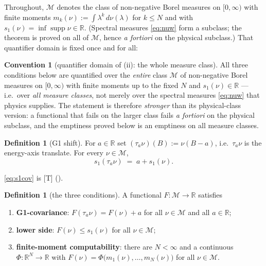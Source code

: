 \documentclass[11pt]{article}
\theoremstyle{definition}
\newtheorem{definition}[theorem]{Definition}
\newtheorem{convention}[theorem]{Convention}
\theoremstyle{remark}
\newcommand{\code}[1]{\texttt{\footnotesize\detokenize{#1}}}
\newcommand{\grT}{\textsf{[T]}}
\begin{document}
Throughout, $\mathcal M$ denotes the class of non-negative Borel measures on
$[0,\infty)$ with finite moments $m_k(\nu):=\int\lambda^k\,d\nu(\lambda)$ for
$k\le N$ and with $s_1(\nu)=\inf\operatorname{supp}\nu\in\mathbb R$. (Spectral
measures \eqref{eq:nuw} form a subclass; the theorem is proved on all of
$\mathcal M$, hence \emph{a fortiori} on the physical subclass.) That
quantifier domain is fixed once and for all:

\begin{convention}[quantifier domain of (ii): the whole measure class]\label{conv:domain}
All three conditions below are quantified over the \emph{entire} class
$\mathcal M$ of non-negative Borel measures on $[0,\infty)$ with finite
moments up to the fixed $N$ and $s_1(\nu)\in\mathbb R$ --- i.e.\ over
\emph{all measure classes}, not merely over the spectral measures
\eqref{eq:nuw} that physics supplies. The statement is therefore
\emph{stronger} than its physical-class version: a functional that fails on
the larger class fails \emph{a fortiori} on the physical subclass, and the
emptiness proved below is an emptiness on all measure classes.
\end{convention}

\begin{definition}[G1 shift]\label{def:G1}
For $a\in\mathbb R$ set $(\tau_a\nu)(B):=\nu(B-a)$, i.e.\ $\tau_a\nu$ is the
energy-axis translate. For every $\nu\in\mathcal M$,
\begin{equation}
s_1(\tau_a\nu)\;=\;a+s_1(\nu).
\label{eq:s1cov}
\end{equation}
\end{definition}
\noindent\eqref{eq:s1cov} is \grT{} (\code{B05-DUAL.md:80}).

\begin{definition}[the three conditions]\label{def:three}
A functional $F:\mathcal M\to\mathbb R$ satisfies
\begin{enumerate}\itemsep2pt
\item[\textbf{(i)}] \textbf{G1-covariance}: $F(\tau_a\nu)=F(\nu)+a$ for all
$\nu\in\mathcal M$ and all $a\in\mathbb R$;
\item[\textbf{(ii)}] \textbf{lower side}: $F(\nu)\le s_1(\nu)$ for all
$\nu\in\mathcal M$;
\item[\textbf{(iii)}] \textbf{finite-moment computability}: there are
$N<\infty$ and a continuous $\Phi:\mathbb R^{N}\to\mathbb R$ with
$F(\nu)=\Phi\bigl(m_1(\nu),\dots,m_N(\nu)\bigr)$ for all $\nu\in\mathcal M$.
\end{enumerate}
\end{definition}
\end{document}
